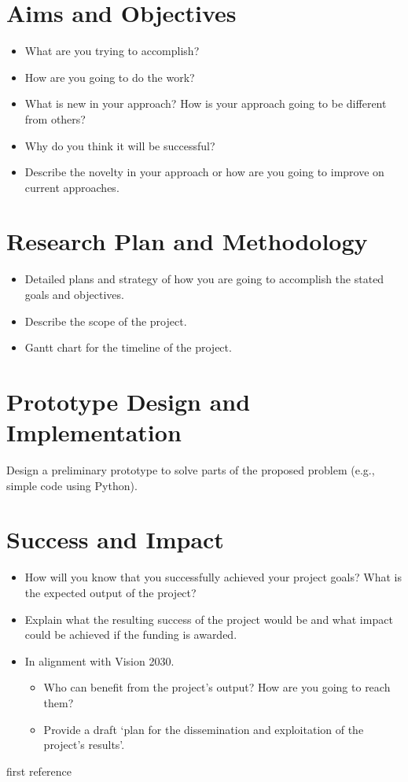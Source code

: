 \documentclass{article}
\begin{document}
\section{Aims and Objectives}
\begin{itemize}
    \item What are you trying to accomplish?
    \item How are you going to do the work?
    \item What is new in your approach? How is your approach going to be different from others?
    \item Why do you think it will be successful?
    \item Describe the novelty in your approach or how are you going to improve on current approaches.
\end{itemize}

\section{Research Plan and Methodology}
\begin{itemize}
    \item Detailed plans and strategy of how you are going to accomplish the stated goals and objectives.
    \item Describe the scope of the project.
    \item Gantt chart for the timeline of the project.
\end{itemize}

\section{Prototype Design and Implementation}
Design a preliminary prototype to solve parts of the proposed problem (e.g., simple code using Python).

\section{Success and Impact}
\begin{itemize}
    \item How will you know that you successfully achieved your project goals? What is the expected output of the project?
    \item Explain what the resulting success of the project would be and what impact could be achieved if the funding is awarded.
    \item In alignment with Vision 2030.
    \begin{itemize}
        \item Who can benefit from the project's output? How are you going to reach them?
        \item Provide a draft ‘plan for the dissemination and exploitation of the project's results’.
    \end{itemize}
\end{itemize}


first reference\cite{Ref1}



\end{document}
